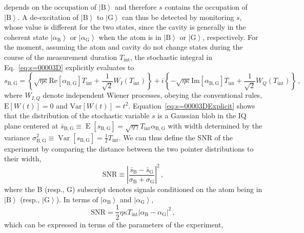 \documentclass[
						superscriptaddress, 																 amsmath, amssymb,
		 aps,  prb,  
										floatfix,
		linenumbers,
			]{revtex4-1}
\newcommand{\ket}[1]{\left|#1\right>}
\begin{document}
depends on the occupation of $\ket{\mathrm{B}}$ \textemdash{} and
therefore $s$ contains the occupation of $\ket{\mathrm{B}}$. A de-excitation
of $\ket{\mathrm{B}}$ to $\ket{\mathrm{G}}$ can thus be detected
by monitoring $s$, whose value is different for the two states, since
the cavity is generally in the coherent state $\ket{\alpha_{\mathrm{B}}}$
or $\ket{\alpha_{\mathrm{G}}}$ when the atom is in $\ket{\mathrm{B}}$
or $\ket{\mathrm{G}}$, respectively. For the moment, assuming the
atom and cavity do not change states during the course of the measurement
duration $T_{\mathrm{int}}$, the stochastic integral in Eq.~\eqref{eq:s=00003D}
explicitly evaluates to 
\begin{equation}
s_{\mathrm{B,G}}=\left\{ \sqrt{\eta\kappa}\mathrm{Re}\left[\alpha_{\mathrm{B,G}}\right]T_{\mathrm{int}}+\frac{1}{\sqrt{2}}W_{I}\left(T_{\mathrm{int}}\right)\right\} +i\left\{ -\sqrt{\eta\kappa}\mathrm{Im}\left[\alpha_{\mathrm{B,G}}\right]T_{\mathrm{int}}+\frac{1}{\sqrt{2}}W_{Q}\left(T_{\mathrm{int}}\right)\right\} \,,\label{eq:s=00003DExplicit}
\end{equation}
where $W_{I,Q}$ denote independent Wiener processes, obeying the
conventional rules, $\mathrm{E}\left[W\left(t\right)\right]=0$ and
$\mathrm{Var}\left[W\left(t\right)\right]=t^{2}$. Equation~\eqref{eq:s=00003DExplicit}
shows that the distribution of the stochastic variable $s$ is a Gaussian
blob in the IQ plane centered at $\bar{s}_{\mathrm{B,G}}\equiv\operatorname{E}\left[s_{\mathrm{B,G}}\right]=\sqrt{\eta\gamma}T_{\mathrm{int}}\alpha_{\mathrm{B,G}}$
with width determined by the variance $\sigma_{\mathrm{B,G}}^{2}\equiv\operatorname{Var}\left[s_{\mathrm{B,G}}\right]=\frac{1}{2}T_{\mathrm{int}}$.
We can thus define the SNR of the experiment by comparing the distance
between the two pointer distributions to their width, 
\begin{equation}
\mathrm{SNR}\equiv\left|\frac{\bar{s}_{\mathrm{B}}-\bar{s}_{\mathrm{G}}}{\sigma_{\mathrm{B}}+\sigma_{\mathrm{G}}}\right|^{2}\,,\label{eq:SNR-defn}
\end{equation}
where the B (resp., G) subscript denotes signals conditioned on the
atom being in $\ket{\mathrm{B}}$ (resp., $\ket{\mathrm{G}}$). In
terms of $\ket{\alpha_{\mathrm{B}}}$ and $\ket{\alpha_{\mathrm{G}}}$,
\begin{equation}
\mathrm{SNR}=\frac{1}{2}\eta\kappa T_{\mathrm{int}}\left|\alpha_{\mathrm{B}}-\alpha_{\mathrm{G}}\right|^{2}\,,
\end{equation}
which can be expressed in terms of the parameters of the experiment,
\end{document}
